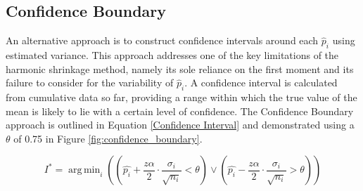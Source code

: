 \documentclass[sigconf,natbib=true,anonymous=true]{acmart}
\DeclareMathOperator*{\argmin}{arg\,min}
\begin{document}

\subsection{Confidence Boundary}

An alternative approach is to construct confidence intervals around each $\hat{p}_i$ using estimated variance. This approach addresses one of the key limitations of the harmonic shrinkage method, namely its sole reliance on the first moment and its failure to consider for the variability of $\hat{p}_i$. A confidence interval is calculated from cumulative data so far, providing a range within which the true value of the mean is likely to lie with a certain level of confidence. The Confidence Boundary approach is outlined in Equation \ref{Confidence Interval} and demonstrated using a $\theta$ of 0.75 in Figure \ref{fig:confidence_boundary}.

\begin{equation}
\label{Confidence Interval}
I^* = \argmin_{i} \left(  \left(\hat{p_i} + \frac{z\alpha}{2} \cdot \frac{\sigma_i}{\sqrt{n_i}} < \theta \right) \lor \left(\hat{p_i} - \frac{z\alpha}{2} \cdot \frac{\sigma_i}{\sqrt{n_i}} > \theta \right) \right)
\end{equation}
\end{document}
